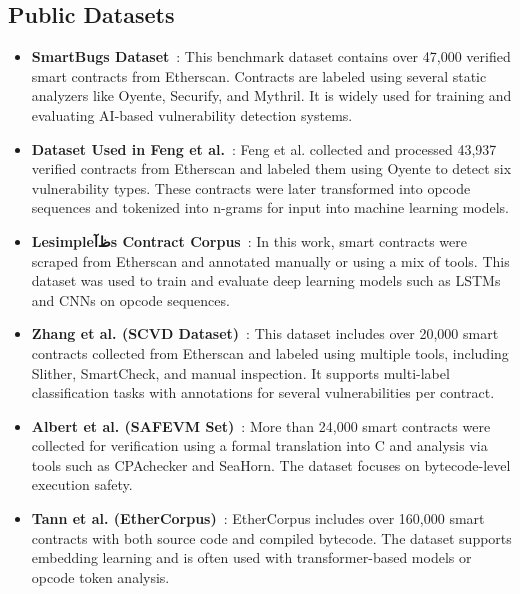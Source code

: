 \subsection*{Public Datasets}

\begin{itemize}

  \item \textbf{SmartBugs Dataset}~\cite{durieux2020empirical}: This benchmark dataset contains over 47,000 verified smart contracts from Etherscan. Contracts are labeled using several static analyzers like Oyente, Securify, and Mythril. It is widely used for training and evaluating AI-based vulnerability detection systems.

  \item \textbf{Dataset Used in Feng et al.}~\cite{feng2024interpretable}: Feng et al. collected and processed 43,937 verified contracts from Etherscan and labeled them using Oyente to detect six vulnerability types. These contracts were later transformed into opcode sequences and tokenized into n-grams for input into machine learning models.

  \item \textbf{Lesimpleظآs Contract Corpus}~\cite{lesimple2020master}: In this work, smart contracts were scraped from Etherscan and annotated manually or using a mix of tools. This dataset was used to train and evaluate deep learning models such as LSTMs and CNNs on opcode sequences.

  \item \textbf{Zhang et al. (SCVD Dataset)}~\cite{zhang2020scvd}: This dataset includes over 20,000 smart contracts collected from Etherscan and labeled using multiple tools, including Slither, SmartCheck, and manual inspection. It supports multi-label classification tasks with annotations for several vulnerabilities per contract.

  \item \textbf{Albert et al. (SAFEVM Set)}~\cite{albert2019safevm}: More than 24,000 smart contracts were collected for verification using a formal translation into C and analysis via tools such as CPAchecker and SeaHorn. The dataset focuses on bytecode-level execution safety.

  \item \textbf{Tann et al. (EtherCorpus)}~\cite{tann2020towards}: EtherCorpus includes over 160,000 smart contracts with both source code and compiled bytecode. The dataset supports embedding learning and is often used with transformer-based models or opcode token analysis.

\end{itemize}

